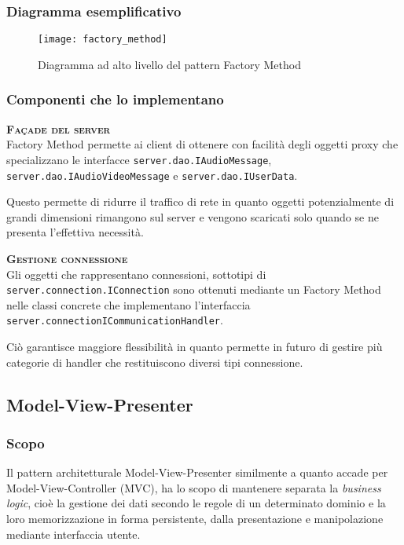 \subsubsection{Diagramma esemplificativo}
\begin{figure}[H]
\centering
\texttt{[image: factory\_method]}
\caption{Diagramma ad alto livello del pattern Factory Method}\label{fig:factory_method}
\end{figure}

\subsubsection{Componenti che lo implementano}
\begin{description}
  \item{\scshape\bfseries Façade del server}\\
Factory Method permette ai client di ottenere con facilità degli oggetti proxy che specializzano le interfacce \texttt{server.dao.IAudioMessage}, \texttt{server.dao.IAudioVideoMessage} e \texttt{server.dao.IUserData}.

Questo permette di ridurre il traffico di rete in quanto oggetti potenzialmente di grandi dimensioni rimangono sul server e vengono scaricati solo quando se ne presenta l'effettiva necessità.
  \item{\scshape\bfseries Gestione connessione}\\
Gli oggetti che rappresentano connessioni, sottotipi di \texttt{server.connection.IConnection} sono ottenuti mediante un Factory Method nelle classi concrete che implementano l'interfaccia \texttt{server.connectionICommunicationHandler}.

Ciò garantisce maggiore flessibilità in quanto permette in futuro di gestire più categorie di handler che restituiscono diversi tipi connessione.
\end{description}

\subsection{Model-View-Presenter}

\subsubsection{Scopo}
Il pattern architetturale \foreignlanguage{english}{Model-View-Presenter} similmente a quanto accade per \foreignlanguage{english}{Model-View-Controller} (MVC), ha lo scopo di mantenere separata la \textit{business logic}, cioè la gestione dei dati secondo le regole di un determinato dominio e la loro memorizzazione in forma persistente, dalla presentazione e manipolazione mediante interfaccia utente.

